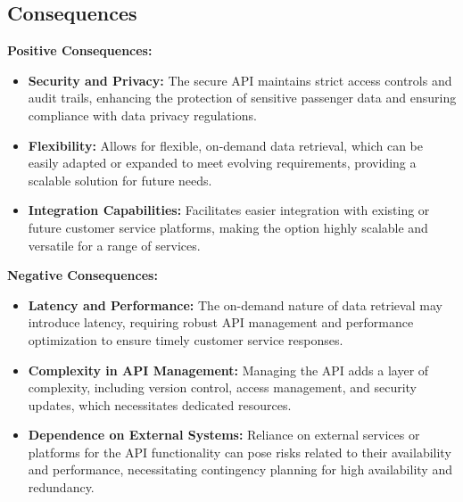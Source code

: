 \subsection*{Consequences}
\textbf{Positive Consequences:}
\begin{itemize}[noitemsep]
    \item \textbf{Security and Privacy:} The secure API maintains strict access controls and audit trails, enhancing the protection of sensitive passenger data and ensuring compliance with data privacy regulations.
    \item \textbf{Flexibility:} Allows for flexible, on-demand data retrieval, which can be easily adapted or expanded to meet evolving requirements, providing a scalable solution for future needs.
    \item \textbf{Integration Capabilities:} Facilitates easier integration with existing or future customer service platforms, making the option highly scalable and versatile for a range of services.
\end{itemize}

\textbf{Negative Consequences:}
\begin{itemize}[noitemsep]
    \item \textbf{Latency and Performance:} The on-demand nature of data retrieval may introduce latency, requiring robust API management and performance optimization to ensure timely customer service responses.
    \item \textbf{Complexity in API Management:} Managing the API adds a layer of complexity, including version control, access management, and security updates, which necessitates dedicated resources.
    \item \textbf{Dependence on External Systems:} Reliance on external services or platforms for the API functionality can pose risks related to their availability and performance, necessitating contingency planning for high availability and redundancy.
\end{itemize}